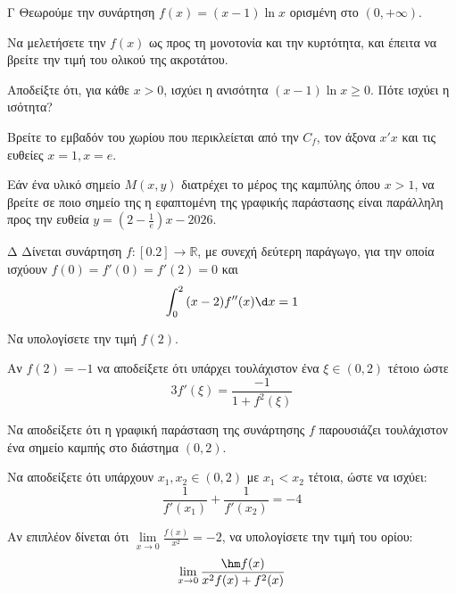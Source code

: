 \begin{thema}{Γ}
Θεωρούμε την συνάρτηση $f(x) = (x-1)\ln x$ ορισμένη στο $(0, +\infty)$.
\begin{erwthma}
    \item Να μελετήσετε την $f(x)$ ως προς τη μονοτονία και την κυρτότητα, και έπειτα να βρείτε την τιμή του ολικού της ακροτάτου. 
    \item Αποδείξτε ότι, για κάθε $x > 0$, ισχύει η ανισότητα $(x-1)\ln x \ge 0$. Πότε ισχύει η ισότητα? 
    \item Βρείτε το εμβαδόν του χωρίου που περικλείεται από την $C_f$, τον άξονα $x'x$ και τις ευθείες $x=1, x=e$. 
    \item Εάν ένα υλικό σημείο $M(x, y)$ διατρέχει το μέρος της καμπύλης όπου $x>1$, να βρείτε σε ποιο σημείο της η εφαπτομένη της γραφικής παράστασης είναι παράλληλη προς την ευθεία $\displaystyle y = \left(2 - \frac{1}{e}\right) x - 2026$. 
\end{erwthma}
\end{thema}

\begin{thema}{Δ}
Δίνεται συνάρτηση $f:[0.2]\to\mathbb{R}$, με συνεχή δεύτερη παράγωγο, για την οποία ισχύουν $f(0)=f'(0)=f'(2)=0$ και 
\[ \int_{0}^{2}{(x-2)f''(x)\d x}=1 \]
\begin{erwthma}
\item Να υπολογίσετε την τιμή $f(2)$.
\item Αν $f(2)=-1$ να αποδείξετε ότι υπάρχει τουλάχιστον ένα $\xi\in(0,2)$ τέτοιο ώστε
\[3f'(\xi)=\frac{-1}{1+f^2(\xi)}\]
\item Να αποδείξετε ότι η γραφική παράσταση της συνάρτησης $f$ παρουσιάζει τουλάχιστον ένα σημείο καμπής στο διάστημα $(0, 2)$.

\item Να αποδείξετε ότι υπάρχουν $x_1, x_2 \in (0, 2)$ με $x_1 < x_2$ τέτοια, ώστε να ισχύει:
\[ \frac{1}{f'(x_1)} + \frac{1}{f'(x_2)} = -4 \]

\item Αν επιπλέον δίνεται ότι $\lim\limits_{x \to 0} \frac{f(x)}{x^2} = -2$, να υπολογίσετε την τιμή του ορίου:
\[ \lim_{x \to 0} \frac{\hm f(x)}{x^2f(x) + f^2(x)} \]
\end{erwthma}
\end{thema}

\newpage
